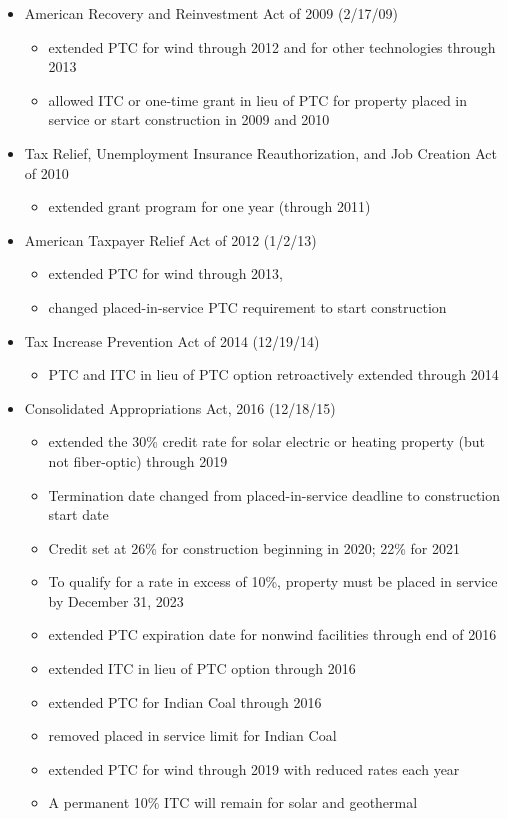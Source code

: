 \documentclass[11pt, oneside]{article}   	%
\begin{document}
\begin{itemize}
\item American Recovery and Reinvestment Act of 2009 (2/17/09)
\begin{itemize}
\item extended PTC for wind through 2012 and for other technologies through 2013
\item allowed ITC or one-time grant in lieu of PTC for property placed in service or start construction in 2009 and 2010
\end{itemize}

\item Tax Relief, Unemployment Insurance Reauthorization, and Job Creation Act of 2010
\begin{itemize} 
\item extended grant program for one year (through 2011)
\end{itemize}

\item American Taxpayer Relief Act of 2012 (1/2/13)
\begin{itemize}
\item extended PTC for wind through 2013, 
\item changed placed-in-service PTC requirement to start construction 
\end{itemize}

\item Tax Increase Prevention Act of 2014 (12/19/14)
\begin{itemize}
\item PTC and ITC in lieu of PTC option retroactively extended through 2014
\end{itemize}

\item Consolidated Appropriations Act, 2016 (12/18/15)
\begin{itemize}
\item extended the 30\% credit rate for solar electric or heating property (but not fiber-optic) through 2019
\item Termination date changed from placed-in-service deadline to construction start date
\item Credit set at 26\% for construction beginning in 2020; 22\% for 2021
\item To qualify for a rate in excess of 10\%, property must be placed in service by December 31, 2023
\item extended PTC expiration date for nonwind facilities through end of 2016
\item extended ITC in lieu of PTC option through 2016
\item extended PTC for Indian Coal through 2016
\item removed placed in service limit for Indian Coal
\item extended PTC for wind through 2019 with reduced rates each year
\item A permanent 10\% ITC will remain for solar and geothermal
\end{itemize}


\end{itemize}
\end{document}
